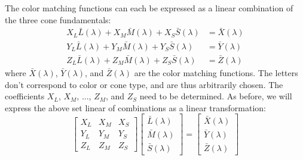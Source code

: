 \documentclass[twocolumn]{article}
\begin{document}
The color matching functions can each be expressed as a linear combination of the three cone fundamentals:
\begin{equation}
    \begin{aligned}
        X_L\bar{L}(\lambda)+X_M\bar{M}(\lambda)+X_S\bar{S}(\lambda)&=\bar{X}(\lambda)\\
        Y_L\bar{L}(\lambda)+Y_M\bar{M}(\lambda)+Y_S\bar{S}(\lambda)&=\bar{Y}(\lambda)\\
        Z_L\bar{L}(\lambda)+Z_M\bar{M}(\lambda)+Z_S\bar{S}(\lambda)&=\bar{Z}(\lambda)
    \end{aligned}
\end{equation}
where $\bar{X}(\lambda)$, $\bar{Y}(\lambda)$, and $\bar{Z}(\lambda)$ are the color matching functions.  The letters don't correspond to color or cone type, and are thus arbitrarily chosen.  The coefficients $X_L$, $X_M$, ..., $Z_M$, and $Z_S$ need to be determined.  As before, we will express the above set linear of combinations as a linear transformation:
\begin{equation}
    \begin{bmatrix}
        X_L&X_M&X_S\\
        Y_L&Y_M&Y_S\\
        Z_L&Z_M&Z_S
    \end{bmatrix}\begin{bmatrix}
        \bar{L}(\lambda)\\
        \bar{M}(\lambda)\\
        \bar{S}(\lambda)
    \end{bmatrix}=\begin{bmatrix}
        \bar{X}(\lambda)\\
        \bar{Y}(\lambda)\\
        \bar{Z}(\lambda)
    \end{bmatrix}
\end{equation}
\end{document}
